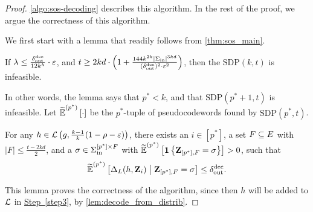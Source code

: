 \begin{proof}
	\cref{algo:sos-decoding} describes this algorithm. In the rest of the proof, we argue the correctness of this algorithm.
	
	We first start with a lemma that readily follows from \cref{thm:sos_main}.
	
	\begin{lemma}\label{lem:pseudocodeword_list_size}
	If $\lambda \leq  \frac{\delta_{\mathrm{out}}^{\mathrm{dec}}}{12k^k} \cdot \varepsilon$, and $t \geq 2kd\cdot \left(1+\frac{144k^{2k}|\Sigma_{\mathrm{in}}|^{3kd}}{(\delta_{\mathrm{out}}^{\mathrm{dec}})^2\cdot \varepsilon^2}\right)$, then the $\mathrm{SDP}(k,t)$ is infeasible.
	\end{lemma}

	In other words, the lemma says that $p^* < k$, and that $\mathrm{SDP}(p^*+1,t)$ is infeasible. Let $\widetilde{\operatorname*{\mathbb{E}}}^{(p^*)}\left[ \cdot \right]$ be the $p^*$-tuple of pseudocodewords found by $\mathrm{SDP}(p^*,t)$.
%	
	\begin{lemma}\label{lem:covering}
	For any $h \in {\mathcal L}\left(g,\frac{k-1}{k}(1-\rho-\varepsilon)\right)$,
there exists an $i\in [p^*]$, a set $F\subseteq E$ with $|F|\leq \frac{t-2kd}{2}$, and a $\sigma \in \Sigma_{\mathrm{in}}^{[p^*]\times F}$ with $\widetilde{\operatorname*{\mathbb{E}}}^{(p^*)}\left[ {{\mathbf{1}} \left\{ { \mathbf{Z} }_{[p^*],F} = \sigma \right\} } \right] > 0$, such that 
	\[
	\pcod{p^*}{\Delta_L(h, \zee_i) \given \zee_{[p^*],F} = \sigma} \leq \delta_{\out}^{\dec}.
	\] 
	\end{lemma}
	This lemma proves the correctness of the algorithm, since then $h$ will be added to ${\mathcal L}$ in \hyperref[step3]{Step~\ref*{step3}}, by \cref{lem:decode_from_distrib}.
\end{proof}

